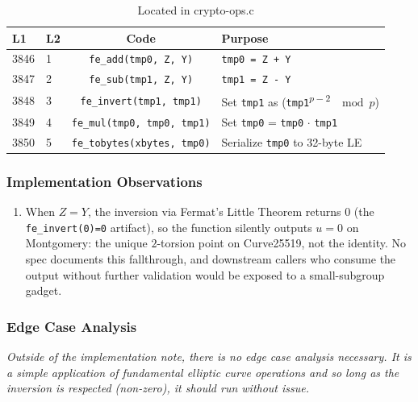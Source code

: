 \documentclass[12pt,titlepage,table]{article}
\begin{document}
\begin{table}[htbp]
\centering
\caption{edwardsYZ\_to\_x25519 Source To Spec Map}
{
\begin{tabular}{| l | l | c | l |}
\hline
\textbf{L1} & \textbf{L2} & \textbf{Code} & \textbf{Purpose} \\
\hline
\hline
3846 &1& \verb+fe_add(tmp0, Z, Y)+ & \verb|tmp0 = Z + Y| \\
3847 &2& \verb|fe_sub(tmp1, Z, Y)| &  \verb|tmp1 = Z - Y| \\
3848 &3& \verb+fe_invert(tmp1, tmp1)+ & Set \verb|tmp1| as (\verb|tmp1|\textsuperscript{$p-2$} $\mod p$) \\
3849 &4& \verb|fe_mul(tmp0, tmp0, tmp1)| & Set \verb|tmp0| = \verb|tmp0| $\cdot$ \verb|tmp1|  \\
3850 &5& \verb|fe_tobytes(xbytes, tmp0)| & Serialize \verb|tmp0| to 32-byte LE \\
\hline
\end{tabular}}
\caption*{Located in crypto-ops.c}
\end{table}

\subsubsection{Implementation Observations}
\begin{enumerate}
\item When $Z=Y$, the inversion via Fermat's Little Theorem returns $0$ (the \verb+fe_invert(0)=0+ artifact), so the function silently outputs $u = 0$ on Montgomery: the unique $2$-torsion point on Curve25519, not the identity.  No spec documents this fallthrough, and downstream callers who consume the output without further validation would be exposed to a small-subgroup gadget.

\end{enumerate}
\subsubsection{Edge Case Analysis}
\textit{Outside of the implementation note, there is no edge case analysis necessary. It is a simple application of fundamental elliptic curve operations and so long as the inversion is respected (non-zero), it should run without issue.}
\end{document}
